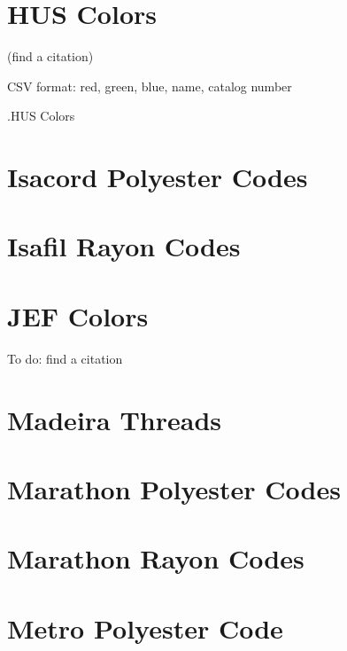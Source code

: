 \documentclass[10pt]{report}
\begin{document}


\section{HUS Colors}

(find a citation)

CSV format: red, green, blue, name, catalog number

.HUS Colors



\section{Isacord Polyester Codes}



\section{Isafil Rayon Codes}

%

\section{JEF Colors}

To do: find a citation

%

\section{Madeira Threads}





\section{Marathon Polyester Codes}

%

\section{Marathon Rayon Codes}

%

\section{Metro Polyester Code}
\end{document}
